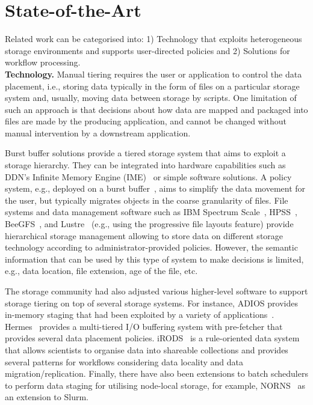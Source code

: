\documentclass{superfri}
\begin{document}
\section{State-of-the-Art}
\label{sec:art}

Related work can be categorised into:
1) Technology that exploits heterogeneous storage environments and supports user-directed policies and
2) Solutions for workflow processing.\\

\textbf{Technology.}
Manual tiering requires the user or application to control the data placement, i.e., storing data typically in the form of files on a particular storage system and, usually, moving data between storage by scripts.
One limitation of such an approach is that decisions about how data are mapped and packaged into files are made by the producing application, and cannot be changed without manual intervention by a downstream application.

Burst buffer solutions provide a tiered storage system that aims to exploit a storage hierarchy.
They can be integrated into hardware capabilities such as DDN's Infinite Memory Engine (IME)~\cite{BODIAIFSFI19} or simple software solutions.
A policy system, e.g., deployed on a burst buffer~\cite{RomanusRP15}, aims to simplify the data movement for the user, but typically migrates objects in the coarse granularity of files.
File systems and data management software such as IBM Spectrum Scale~\cite{SchmuckH02}, HPSS~\cite{528214}, BeeGFS~\cite{beegfs}, and Lustre~\cite{abs-1903-01955} (e.g., using the progressive file layouts feature) provide hierarchical storage management allowing to store data on different storage technology according to administrator-provided policies.
However, the semantic information that can be used by this type of system to make decisions is limited, e.g., data location, file extension, age of the file, etc.

The storage community had also adjusted various higher-level software to support storage tiering on top of several storage systems. For instance, ADIOS provides in-memory staging that had been exploited by a variety of applications~\cite{slawinska2013maya}.
Hermes~\cite{kougkas2020acceleration} provides a multi-tiered I/O buffering system with pre-fetcher that provides several data placement policies.
iRODS~\cite{rajasekar2010irods} is a rule-oriented data system that allows scientists to organise data into shareable collections and provides several patterns for workflows considering data locality and data migration/replication.
Finally, there have also been extensions to batch schedulers to perform data staging for utilising node-local storage, for example, NORNS~\cite{miranda2019norns} as an extension to Slurm.\\
\end{document}
